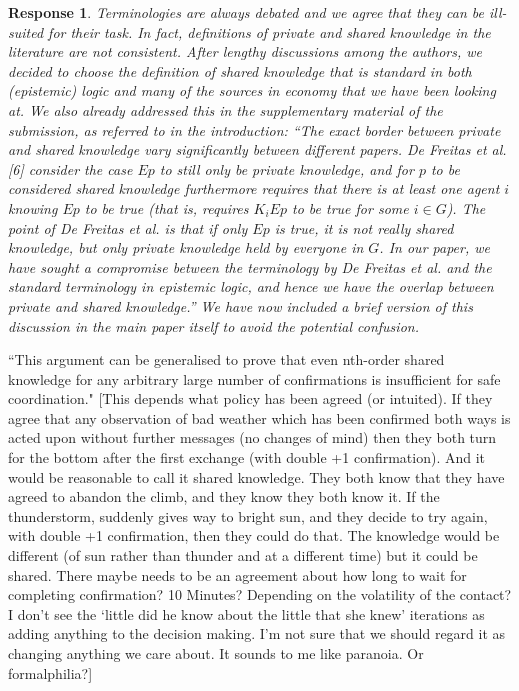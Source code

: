 \documentclass[a4paper]{article}
\newtheorem{response}{Response}
\begin{document}
\begin{response}
Terminologies are always debated and we agree that they can be ill-suited for their task. In fact, definitions of private and shared knowledge in the literature are not consistent. After lengthy discussions among the authors, we decided to choose the definition of shared knowledge that is standard in both (epistemic) logic and many of the sources in economy that we have been looking at. We also already addressed this in the supplementary material of the submission, as referred to in the introduction:  ``The exact border between private and shared knowledge vary significantly between different papers. De Freitas et al. [6] consider the case $Ep$ to still only be private knowledge, and for $p$ to be considered shared knowledge furthermore requires that there is at least one agent $i$ knowing $Ep$ to be true (that is, requires $K_i Ep$ to be true for some $i \in G$). The point of De Freitas et al. is that if only $Ep$ is true, it is not really shared knowledge, but only private knowledge held by everyone in $G$. In our paper, we have sought a compromise between the terminology by De Freitas et al. and the standard terminology in epistemic logic, and hence we have the overlap between private and shared knowledge.'' We have now included a brief version of this discussion in the main paper itself to avoid the potential confusion. 
\end{response}

``This argument can be generalised to prove that even nth-order shared knowledge for any arbitrary large number of confirmations is insufficient for safe coordination." [This depends what policy has been agreed (or intuited). If they agree that any observation of bad weather which has been confirmed both ways is acted upon without further messages (no changes of mind) then they both turn for the bottom after the first exchange (with double +1 confirmation). And it would be reasonable to call it shared knowledge. They both know that they have agreed to abandon the climb, and they know they both know it. If the thunderstorm, suddenly gives way to bright sun, and they decide to try again, with double +1 confirmation, then they could do that. The knowledge would be different (of sun rather than thunder and at a different time) but it could be shared. There maybe needs to be an agreement about how long to wait for completing confirmation? 10 Minutes? Depending on the volatility of the contact? I don't see the `little did he know about the little that she knew' iterations as adding anything to the decision making. I'm not sure that we should regard it as changing anything we care about. It sounds to me like paranoia. Or formalphilia?]
\end{document}
